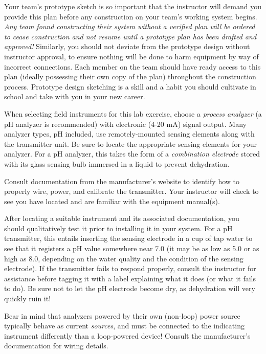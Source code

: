 \documentclass[12pt,a4paper]{article}
\begin{document}
Your team's prototype sketch is so important that the instructor will demand you provide this plan before any construction on your team's working system begins.  {\it Any team found constructing their system without a verified plan will be ordered to cease construction and not resume until a prototype plan has been drafted and approved!}  Similarly, you should not deviate from the prototype design without instructor approval, to ensure nothing will be done to harm equipment by way of incorrect connections.  Each member on the team should have ready access to this plan (ideally possessing their own copy of the plan) throughout the construction process.  Prototype design sketching is a skill and a habit you should cultivate in school and take with you in your new career.

\vskip 10pt

When selecting field instruments for this lab exercise, choose a {\it process analyzer} (a pH analyzer is recommended) with electronic (4-20 mA) signal output.  Many analyzer types, pH included, use remotely-mounted sensing elements along with the transmitter unit.  Be sure to locate the appropriate sensing elements for your analyzer.  For a pH analyzer, this takes the form of a {\it combination electrode} stored with its glass sensing bulb immersed in a liquid to prevent dehydration.

Consult documentation from the manufacturer's website to identify how to properly wire, power, and calibrate the transmitter.  Your instructor will check to see you have located and are familiar with the equipment manual(s).

After locating a suitable instrument and its associated documentation, you should qualitatively test it prior to installing it in your system.  For a pH transmitter, this entails inserting the sensing electrode in a cup of tap water to see that it registers a pH value somewhere near 7.0 (it may be as low as 5.0 or as high as 8.0, depending on the water quality and the condition of the sensing electrode).  If the transmitter fails to respond properly, consult the instructor for assistance before tagging it with a label explaining what it does (or what it fails to do).  Be sure not to let the pH electrode become dry, as dehydration will very quickly ruin it!

Bear in mind that analyzers powered by their own (non-loop) power source typically behave as current {\it sources}, and must be connected to the indicating instrument differently than a loop-powered device!  Consult the manufacturer's documentation for wiring details.
\end{document}
